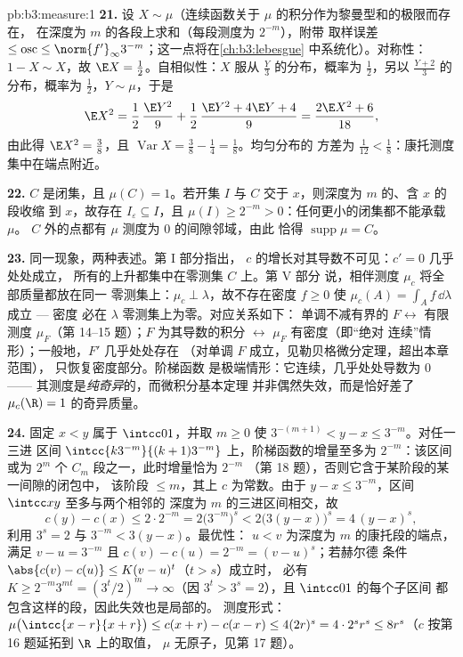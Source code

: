 \begin{solution}{pb:b3:measure:1}
\textbf{21.} 设 $X \sim \mu$（连续函数关于
$\mu$ 的积分作为黎曼型和的极限而存在，
在深度为 $m$ 的各段上求和（每段测度为 $2^{-m}$），附带
取样误差 $\leq \operatorname{osc} \leq
\norm{f'}_\infty3^{-m}$；这一点将在\cref{ch:b3:lebesgue}
中系统化）。对称性：$1 - X \sim X$，故 $\E X =
\frac12$。自相似性：$X$ 服从 $\frac Y3$ 的分布，概率为
$\frac12$，另以 $\frac{Y+2}3$ 的分布，概率为
$\frac12$，$Y \sim \mu$，于是
\[
\E X^2 = \frac12\,\frac{\E Y^2}9 + \frac12\,
\frac{\E Y^2 + 4\E Y + 4}{9} = \frac{2\E X^2 + 6}{18},
\]
由此得 $\E X^2 = \frac38$，且 $\operatorname{Var}X = \frac38
- \frac14 = \frac18$。均匀分布的
方差为 $\frac1{12} < \frac18$：康托测度集中在端点附近。

\textbf{22.} $C$ 是闭集，且 $\mu(C) = 1$。若开集 $I$
与 $C$ 交于 $x$，则深度为 $m$ 的、含 $x$ 的段收缩
到 $x$，故存在 $I_\varepsilon \subseteq I$，且 $\mu(I) \geq
2^{-m} > 0$：任何更小的闭集都不能承载 $\mu$。
$C$ 外的点都有 $\mu$ 测度为 $0$ 的间隙邻域，由此
恰得 $\operatorname{supp}\mu = C$。

\textbf{23.} 同一现象，两种表述。第 I 部分指出，
$c$ 的增长对其导数不可见：$c' = 0$ 几乎处处成立，
所有的上升都集中在零测集 $C$ 上。第 V 部分
说，相伴测度 $\mu_c$ 将全部质量都放在同一
零测集上：$\mu_c \perp \lambda$，故不存在密度 $f \geq
0$ 使 $\mu_c(A) = \int_Af\,\dd\lambda$ 成立 --- 密度
必在 $\lambda$ 零测集上为零。对应关系如下：
单调不减有界的 $F \leftrightarrow$ 有限测度
$\mu_F$（第 14--15 题）；$F$ 为其导数的积分
$\leftrightarrow$ $\mu_F$ 有密度（即“绝对
连续”情形）；一般地，$F'$ 几乎处处存在
（对单调 $F$ 成立，见勒贝格微分定理，超出本章范围），
只恢复密度部分。阶梯函数
是极端情形：它连续，几乎处处导数为 $0$ ——
其测度是\emph{纯奇异}的，而微积分基本定理
并非偶然失效，而是恰好差了
$\mu_c(\R) = 1$ 的奇异质量。

\textbf{24.} 固定 $x < y$ 属于 $\intcc01$，并取 $m \geq 0$
使 $3^{-(m+1)} < y - x \leq 3^{-m}$。对任一三进
区间 $\intcc{k3^{-m}}{(k+1)3^{-m}}$ 上，阶梯函数的增量至多为
$2^{-m}$：该区间或为 $2^m$
个 $C_m$ 段之一，此时增量恰为 $2^{-m}$
（第 18 题），否则它含于某阶段的某一间隙的闭包中，
该阶段 $\leq m$，其上 $c$ 为常数。由于 $y - x \leq
3^{-m}$，区间 $\intcc xy$ 至多与两个相邻的
深度为 $m$ 的三进区间相交，故
\[
c(y) - c(x) \leq 2\cdot2^{-m}
= 2\bigl(3^{-m}\bigr)^{s}
< 2\bigl(3(y - x)\bigr)^{s}
= 4\,(y - x)^{s},
\]
利用 $3^{s} = 2$ 与 $3^{-m} < 3(y - x)$。最优性：
$u < v$ 为深度为 $m$ 的康托段的端点，满足 $v - u =
3^{-m}$ 且 $c(v) - c(u) = 2^{-m} = (v - u)^{s}$；若赫尔德
条件 $\abs{c(v) - c(u)} \leq K(v - u)^{t}$（$t > s$）成立时，
必有 $K \geq 2^{-m}3^{mt} = (3^{t}/2)^{m} \to \infty$（因
$3^{t} > 3^{s} = 2$），且 $\intcc01$ 的每个子区间
都包含这样的段，因此失效也是局部的。
测度形式：$\mu\bigl(\intcc{x-r}{x+r}\bigr) \leq
c(x + r) - c(x - r) \leq 4(2r)^{s} = 4\cdot2^{s}r^{s} \leq
8r^{s}$（$c$ 按第 16 题延拓到 $\R$ 上的取值，
$\mu$ 无原子，见第 17 题）。


\end{solution}
